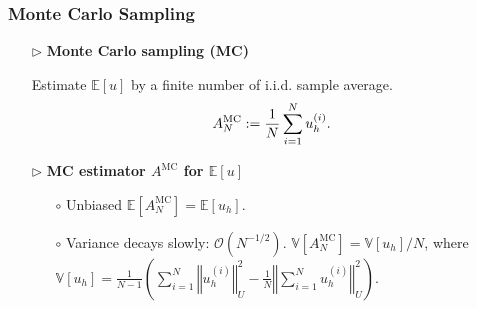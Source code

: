 \documentclass{beamer}
\begin{document}
\begin{frame}[t]
\frametitle{Monte Carlo Sampling}

\begin{itemize}[leftmargin=5pt] 
    \item[$\triangleright$] \textcolor{myblue3}{\bf Monte Carlo sampling (MC)}
    
    {\footnotesize 
    Estimate $\mathbb{E}[u]$ by  a finite number of i.i.d. sample average.
        \[
    A^{\text{MC}}_N:= \frac {1}{N}\sum_{i=1}^N u_h^{(i)}.
    \vspace{-2mm}
    \]
     }       
    \item[$\triangleright$] \textcolor{myblue3}{\bf MC estimator $A^{\text{MC}}$ for $\mathbb{E}[u]$}
    {\footnotesize 
    \begin{itemize}[leftmargin=15pt] 
    \item[$\circ$] Unbiased $\mathbb{E}[A^{\text{MC}}_N] = \mathbb{E}[u_h]$.
    \item[$\circ$] Variance decays slowly: $\mathcal{O}(N^{-1/2})$. $\mathbb{V}[A^{\text{MC}}_N]= \mathbb{V}[u_h]/N$, where $
    \mathbb{V}[u_h] = \frac{1}{N-1}\left(\sum_{i=1}^{N}\left\Vert u_h^{(i)}\right\Vert_{U}^2-\frac{1}{N}\left\Vert\sum_{i=1}^{N}u_h^{(i)}\right\Vert_{U}^2\right).
    $
    \end{itemize}
    }
    
    
    
            
\end{itemize}

\end{frame}
\end{document}
